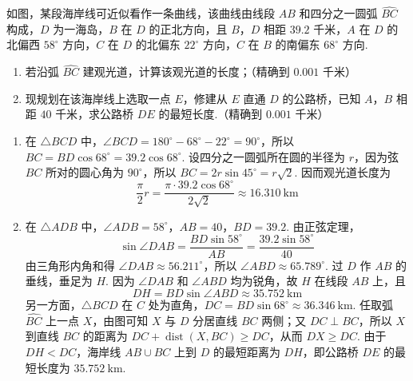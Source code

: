 \begin{problem}
如图，某段海岸线可近似看作一条曲线，该曲线由线段 \(AB\) 和四分之一圆弧 \(\widehat{BC}\) 构成，\(D\) 为一海岛，\(B\) 在 \(D\) 的正北方向，且 \(B\)，\(D\) 相距 \(39.2\text{ 千米}\)，\(A\) 在 \(D\) 的北偏西 \(58^\circ\) 方向，\(C\) 在 \(D\) 的北偏东 \(22^\circ\) 方向，\(C\) 在 \(B\) 的南偏东 \(68^\circ\) 方向.

\begin{enumerate}
\item 若沿弧 \(\widehat{BC}\) 建观光道，计算该观光道的长度；（精确到 \(0.001\text{ 千米}\)）
\item 现规划在该海岸线上选取一点 \(E\)，修建从 \(E\) 直通 \(D\) 的公路桥，已知 \(A\)，\(B\) 相距 \(40\text{ 千米}\)，求公路桥 \(DE\) 的最短长度.（精确到 \(0.001\text{ 千米}\)）
\end{enumerate}

\FloatBarrier
\end{problem}

\begin{solution}
\begin{enumerate}
\item 在 \(\triangle BCD\) 中，\(\angle BCD=180^\circ-68^\circ-22^\circ=90^\circ\)，所以 \(BC=BD\cos68^\circ=39.2\cos68^\circ\). 设四分之一圆弧所在圆的半径为 \(r\)，因为弦 \(BC\) 所对的圆心角为 \(90^\circ\)，所以 \(BC=2r\sin45^\circ=r\sqrt2\). 因而观光道长度为
\[
\frac\pi2r=\frac{\pi\cdot39.2\cos68^\circ}{2\sqrt2}\approx16.310\mathrm{~km}
\]
\item 在 \(\triangle ADB\) 中，\(\angle ADB=58^\circ\)，\(AB=40\)，\(BD=39.2\). 由正弦定理，
\[
\sin\angle DAB=\frac{BD\sin58^\circ}{AB}=\frac{39.2\sin58^\circ}{40}
\]
由三角形内角和得 \(\angle DAB\approx56.211^\circ\)，所以 \(\angle ABD\approx65.789^\circ\). 过 \(D\) 作 \(AB\) 的垂线，垂足为 \(H\). 因为 \(\angle DAB\) 和 \(\angle ABD\) 均为锐角，故 \(H\) 在线段 \(AB\) 上，且
\[
DH=BD\sin\angle ABD\approx35.752\mathrm{~km}
\]
另一方面，\(\triangle BCD\) 在 \(C\) 处为直角，\(DC=BD\sin68^\circ\approx36.346\mathrm{~km}\). 任取弧 \(\widehat{BC}\) 上一点 \(X\)，由图可知 \(X\) 与 \(D\) 分居直线 \(BC\) 两侧；又 \(DC\perp BC\)，所以 \(X\) 到直线 \(BC\) 的距离为 \(DC+\operatorname{dist}(X,BC)\ge DC\)，从而 \(DX\ge DC\). 由于 \(DH<DC\)，海岸线 \(AB\cup\widehat{BC}\) 上到 \(D\) 的最短距离为 \(DH\)，即公路桥 \(DE\) 的最短长度为 \(35.752\mathrm{~km}\).
\end{enumerate}
\end{solution}

